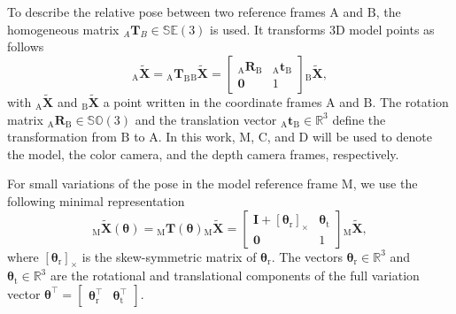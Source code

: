 \documentclass[10pt,twocolumn,letterpaper]{article}
\begin{document}
To describe the relative pose between two reference frames $\textrm{A}$ and $\textrm{B}$, the homogeneous matrix ${}_A\pmb{T}_B{}\in \mathbb{SE}(3)$ is used.
It transforms 3D model points as follows
\begin{equation} \label{eq:p03}
	_\textrm{A}\pmb{\widetilde{X}} = {}_\textrm{A}\pmb{T}_\textrm{B}{}_\textrm{B}\pmb{\widetilde{X}} =
	\begin{bmatrix}
		_\textrm{A}\pmb{R}_\textrm{B} & _\textrm{A}\pmb{t}_\textrm{B} \\ \pmb{0} & 1
	\end{bmatrix}
	{}_\textrm{B}\pmb{\widetilde{X}},
\end{equation}
with $_\textrm{A}\pmb{\widetilde{X}}$ and $_\textrm{B}\pmb{\widetilde{X}}$ a point written in the coordinate frames $\textrm{A}$ and $\textrm{B}$.
The rotation matrix $_\textrm{A}\pmb{R}_\textrm{B} \in \mathbb{SO}(3)$ and the translation vector $_\textrm{A}\pmb{t}_\textrm{B} \in \mathbb{R}^3$ define the transformation from $\textrm{B}$ to $\textrm{A}$.
In this work, $\textrm{M}$, $\textrm{C}$, and $\textrm{D}$ will be used to denote the model, the color camera, and the depth camera frames, respectively.

For small variations of the pose in the model reference frame $\textrm{M}$, we use the following minimal representation
\begin{equation} \label{eq:p04}
	_\textrm{M}\pmb{\widetilde{X}}(\pmb{\theta}) =
	{}_\textrm{M}\pmb{T}(\pmb{\theta}){}_\textrm{M}\pmb{\widetilde{X}} =
	\begin{bmatrix}
		\pmb{I} + [\pmb{\theta}_\textrm{r}]_\times & \pmb{\theta}_\textrm{t} \\ \pmb{0} & 1
	\end{bmatrix}
	{}_\textrm{M}\pmb{\widetilde{X}},
\end{equation}
where $[\pmb{\theta}_\textrm{r}]_\times$ is the skew-symmetric matrix of $\pmb{\theta}_\textrm{r}$.
The vectors $\pmb{\theta}_\textrm{r}\in \mathbb{R}^3$ and $\pmb{\theta}_\textrm{t}\in \mathbb{R}^3$ are the rotational and translational components of the full variation vector $\pmb{\theta}^\top = \begin{bmatrix} \pmb{\theta}_\textrm{r}^\top & \pmb{\theta}_\textrm{t}^\top \end{bmatrix}$.
\end{document}
